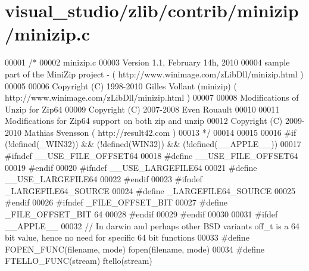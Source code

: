 \hypertarget{visual__studio_2zlib_2contrib_2minizip_2minizip_8c_source}{}\section{visual\+\_\+studio/zlib/contrib/minizip/minizip.c}
\label{visual__studio_2zlib_2contrib_2minizip_2minizip_8c_source}

\begin{DoxyCode}
00001 \textcolor{comment}{/*}
00002 \textcolor{comment}{   minizip.c}
00003 \textcolor{comment}{   Version 1.1, February 14h, 2010}
00004 \textcolor{comment}{   sample part of the MiniZip project - ( http://www.winimage.com/zLibDll/minizip.html )}
00005 \textcolor{comment}{}
00006 \textcolor{comment}{         Copyright (C) 1998-2010 Gilles Vollant (minizip) ( http://www.winimage.com/zLibDll/minizip.html )}
00007 \textcolor{comment}{}
00008 \textcolor{comment}{         Modifications of Unzip for Zip64}
00009 \textcolor{comment}{         Copyright (C) 2007-2008 Even Rouault}
00010 \textcolor{comment}{}
00011 \textcolor{comment}{         Modifications for Zip64 support on both zip and unzip}
00012 \textcolor{comment}{         Copyright (C) 2009-2010 Mathias Svensson ( http://result42.com )}
00013 \textcolor{comment}{*/}
00014 
00015 
00016 \textcolor{preprocessor}{#if (!defined(\_WIN32)) && (!defined(WIN32)) && (!defined(\_\_APPLE\_\_))}
00017 \textcolor{preprocessor}{        #ifndef \_\_USE\_FILE\_OFFSET64}
00018 \textcolor{preprocessor}{                #define \_\_USE\_FILE\_OFFSET64}
00019 \textcolor{preprocessor}{        #endif}
00020 \textcolor{preprocessor}{        #ifndef \_\_USE\_LARGEFILE64}
00021 \textcolor{preprocessor}{                #define \_\_USE\_LARGEFILE64}
00022 \textcolor{preprocessor}{        #endif}
00023 \textcolor{preprocessor}{        #ifndef \_LARGEFILE64\_SOURCE}
00024 \textcolor{preprocessor}{                #define \_LARGEFILE64\_SOURCE}
00025 \textcolor{preprocessor}{        #endif}
00026 \textcolor{preprocessor}{        #ifndef \_FILE\_OFFSET\_BIT}
00027 \textcolor{preprocessor}{                #define \_FILE\_OFFSET\_BIT 64}
00028 \textcolor{preprocessor}{        #endif}
00029 \textcolor{preprocessor}{#endif}
00030 
00031 \textcolor{preprocessor}{#ifdef \_\_APPLE\_\_}
00032 \textcolor{comment}{// In darwin and perhaps other BSD variants off\_t is a 64 bit value, hence no need for specific 64 bit
       functions}
00033 \textcolor{preprocessor}{#define FOPEN\_FUNC(filename, mode) fopen(filename, mode)}
00034 \textcolor{preprocessor}{#define FTELLO\_FUNC(stream) ftello(stream)}

\end{DoxyCode}
